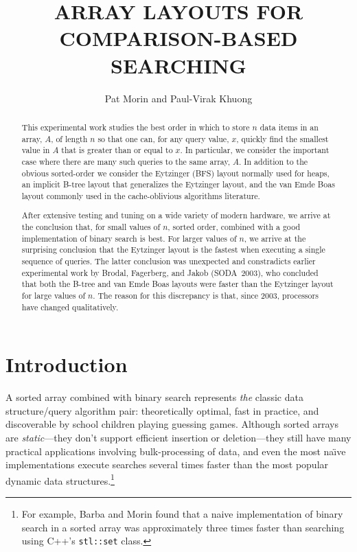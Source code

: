 \documentclass{patmorin}
\title{\MakeUppercase{Array Layouts for Comparison-Based Searching}}
\author{Pat Morin and Paul-Virak Khuong}
\begin{document}
\begin{titlepage}
\maketitle

\begin{abstract}
  This experimental work studies the best order in which to store $n$
  data items in an array, $A$, of length $n$ so that one can, for any
  query value, $x$, quickly find the smallest value in $A$ that is greater
  than or equal to $x$. In particular, we consider the important case
  where there are many such queries to the same array, $A$.  In addition
  to the obvious sorted-order we consider the Eytzinger (BFS) layout
  normally used for heaps, an implicit B-tree layout that generalizes
  the Eytzinger layout, and the van Emde Boas layout commonly used in
  the cache-oblivious algorithms literature.

  After extensive testing and tuning on a wide variety of modern hardware,
  we arrive at the conclusion that, for small values of $n$, sorted
  order, combined with a good implementation of binary search is best.
  For larger values of $n$, we arrive at the surprising conclusion that
  the Eytzinger layout is the fastest when executing a single sequence
  of queries.  The latter conclusion was unexpected and constradicts
  earlier experimental work by Brodal, Fagerberg, and Jakob (SODA~2003),
  who concluded that both the B-tree and van Emde Boas layouts were faster
  than the Eytzinger layout for large values of $n$.  The reason for this
  discrepancy is that, since 2003, processors have changed qualitatively.
\end{abstract}

\end{titlepage}

\section{Introduction}

A sorted array combined with binary search represents \emph{the} classic
data structure/query algorithm pair: theoretically optimal, fast in
practice, and discoverable by school children playing guessing games.
Although sorted arrays are \emph{static}---they don't support efficient
insertion or deletion---they still have many practical applications
involving bulk-processing of data, and even the most na\"{\i}ve
implementations execute searches several times faster than the most
popular dynamic data structures.\footnote{For example, Barba and
Morin \cite{bmXX} found that a naive implementation of binary search
in a sorted array was approximately three times faster than searching
using C++'s \texttt{stl::set} class.}
\end{document}
